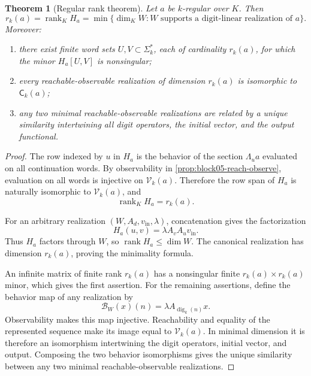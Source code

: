 \documentclass[11pt]{article}
\newtheorem{theorem}{Theorem}[section]
\theoremstyle{definition}
\theoremstyle{remark}
\DeclareMathOperator{\rank}{rank}
\begin{document}
\begin{theorem}[Regular rank theorem]
\label{thm:block05-regular-rank}
Let \(a\) be \(k\)-regular over \(K\).  Then
\begin{equation}
\boxed{
 r_k(a)
 =
 \rank_K H_a
 =
 \min\{\dim_K W:W\text{ supports a digit-linear realization of }a\}.
}
\label{eq:block05-rank-identity}
\end{equation}
Moreover:
\begin{enumerate}
\item there exist finite word sets \(U,V\subset\Sigma_k^*\), each of cardinality \(r_k(a)\), for which the minor \(H_a[U,V]\) is nonsingular;
\item every reachable-observable realization of dimension \(r_k(a)\) is isomorphic to \(\mathsf C_k(a)\);
\item any two minimal reachable-observable realizations are related by a unique similarity intertwining all digit operators, the initial vector, and the output functional.
\end{enumerate}
\end{theorem}

\begin{proof}
The row indexed by \(u\) in \(H_a\) is the behavior of the section \(\Lambda_u a\) evaluated on all continuation words.  By observability in \cref{prop:block05-reach-observe}, evaluation on all words is injective on \(\mathcal V_k(a)\).  Therefore the row span of \(H_a\) is naturally isomorphic to \(\mathcal V_k(a)\), and
\[
\rank_K H_a=r_k(a).
\]

For an arbitrary realization \((W,A_d,v_{\mathrm{in}},\lambda)\), concatenation gives the factorization
\[
H_a(u,v)
=
\lambda A_vA_uv_{\mathrm{in}}.
\]
Thus \(H_a\) factors through \(W\), so \(\rank H_a\leq\dim W\).  The canonical realization has dimension \(r_k(a)\), proving the minimality formula.

An infinite matrix of finite rank \(r_k(a)\) has a nonsingular finite \(r_k(a)\times r_k(a)\) minor, which gives the first assertion.  For the remaining assertions, define the behavior map of any realization by
\[
\mathcal B_W(x)(n)=\lambda A_{\operatorname{dig}_k(n)}x.
\]
Observability makes this map injective.  Reachability and equality of the represented sequence make its image equal to \(\mathcal V_k(a)\).  In minimal dimension it is therefore an isomorphism intertwining the digit operators, initial vector, and output.  Composing the two behavior isomorphisms gives the unique similarity between any two minimal reachable-observable realizations.
\end{proof}
\end{document}
